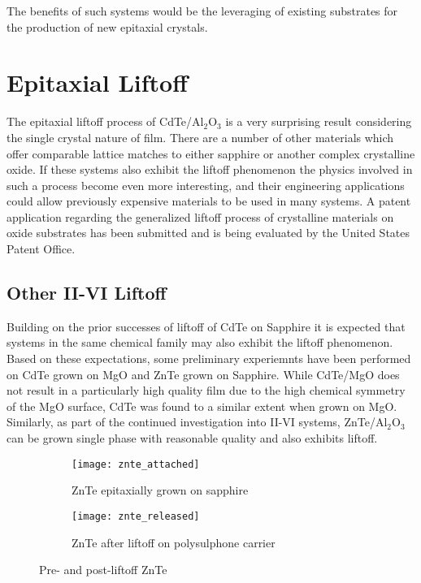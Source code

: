 The benefits of such systems would be the leveraging of existing substrates for the production of new epitaxial crystals.

\section{Epitaxial Liftoff}
The epitaxial liftoff process of CdTe/Al\(_2\)O\(_3\) is a very surprising result considering the single crystal nature of film.
There are a number of other materials which offer comparable lattice matches to either sapphire or another complex crystalline oxide.
If these systems also exhibit the liftoff phenomenon the physics involved in such a process become even more interesting, and their engineering applications could allow previously expensive materials to be used in many systems.
A patent application regarding the generalized liftoff process of crystalline materials on oxide substrates has been submitted and is being evaluated by the United States Patent Office.

\subsection{Other II-VI Liftoff} Building on the prior successes of liftoff of CdTe on Sapphire it is expected that systems in the same chemical family may also exhibit the liftoff phenomenon.
Based on these expectations, some preliminary experiemnts have been performed on CdTe grown on MgO and ZnTe grown on Sapphire.
While CdTe/MgO does not result in a particularly high quality film due to the high chemical symmetry of the MgO surface, CdTe was found to a similar extent when grown on MgO\@. Similarly, as part of the continued investigation into II-VI systems, ZnTe/Al\(_2\)O\(_3\) can be grown single phase with reasonable quality and also exhibits liftoff.
\begin{figure}
 \centering
 \begin{subfigure}[t]{0.5\textwidth}
  \centering \texttt{[image: znte\_attached]}
  \caption{\label{fig:znte_attached}ZnTe epitaxially grown on sapphire}
 \end{subfigure}%
 \begin{subfigure}[t]{0.5\textwidth}
  \centering \texttt{[image: znte\_released]}
  \caption{\label{fig:znte_released}ZnTe after liftoff on polysulphone carrier}
 \end{subfigure}
 \caption{\label{fig:znte_liftoff}Pre- and post-liftoff ZnTe}
\end{figure}

